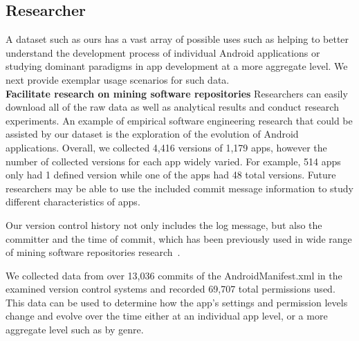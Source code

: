 %







\subsection{Researcher}

%


A dataset such as ours has a vast array of possible uses such as helping to better understand the development process of individual Android applications or studying dominant paradigms in app development at a more aggregate level. We next provide exemplar usage scenarios for such data. \\

\textbf{Facilitate research on mining software repositories}
Researchers can easily download all of the raw data as well as analytical results and conduct research experiments. An example of empirical software engineering research that could be assisted by our dataset is the exploration of the evolution of Android applications. Overall, we collected 4,416 versions of 1,179 apps, however the number of collected versions for each app widely varied. For example, 514 apps only had 1 defined version while one of the apps had 48 total versions. Future researchers may be able to use the included commit message information to study different characteristics of apps.

Our version control history not only includes the log message, but also the committer and the time of commit, which has been previously used in wide range of mining software repositories research~\cite{Eyolfson:2011:TDD:1985441.1985464, bachmann2010missing, Buse:2010:ADP:1858996.1859005, Dallmeier:2007:EBL:1321631.1321702}.


We collected data from over 13,036 commits of the AndroidManifest.xml in the examined version control systems and recorded 69,707 total permissions used. This data can be used to determine how the app's settings and permission levels change and evolve over the time either at an individual app level, or a more aggregate level such as by genre.\\


